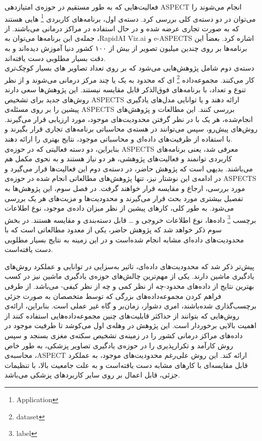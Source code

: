 فعالیت‌هایی که به طور مستقیم در حوزه‌ی امتیازدهی ASPECT انجام می‌شوند را می‌توان در دو دسته‌ی کلی بررسی کرد.
دسته‌ی اول، برنامه‌های کاربردی
\footnote{Application} ‌هایی هستند 
که به صورت تجاری عرضه شده و در حال استفاده در مراکز درمانی می‌باشند.
از جمله‌ی این برنامه‌ها می‌توان به ،RapidAI Viz.ai و e-ASPECTS اشاره کرد.
بعضاً این برنامه‌ها بر روی چندین میلیون تصویر از بیش از ۱۰۰ کشور دنیا آموزش دیده‌اند
\cite{rapidai}
و به دقت بسیار مطلوبی دست یافته‌اند.\\
دسته‌ی دوم شامل پژوهش‌هایی می‌شود که بر روی
تعداد تصاویر
های بسیار کوچک‌تری کار می‌کنند.
مجموعه‌داده‌
\footnote{dataset}
ای که محدود به یک یا چند مرکز درمانی می‌شوند و از نظر تنوع و تعداد،‌ با برنامه‌های فوق‌الذکر قابل مقایسه نیستند.
این پژوهش‌ها سعی دارند روش‌های جدید برای تشخیص ASPECTS ارائه دهند و یا توانایی مدل‌های یادگیری پیشین را بر روی مسئله‌ی ASPECTS بررسی کنند.
 این مطالعات و پژوهش‌های انجام‌شده، هر یک با در نظر 
 گرفتن محدودیت‌های  موجود، مورد ارزیابی قرار 
 می‌گیرند.
روش‌های پیش‌رو، سپس می‌توانند در هسته‌ی محاسباتی برنامه‌های تجاری قرار بگیرند 
و با استفاده از ظرفیت‌های داده‌ای و محاسباتی موجود، نتایج بهتری را ارائه دهند.\\
بنابراین، دو دسته فعالیتی که در حوزه‌ی ASPECTS معرفی شد، یعنی برنامه‌های کاربردی توانمند و فعالیت‌های پژوهشی، هر دو نیاز هستند و به نحوی مکمل هم می‌باشند.
بدیهی‌ است که پژوهش حاضر، در دسته‌ی دوم این فعالیت‌ها قرار می‌گیرد
و در ادامه‌ی این نوشتار نیز، تنها پژوهش‌های مطالعاتی انجام شده در حوزه‌ی ASPECTS مورد بررسی، ارجاع و مقایسه قرار خواهند گرفت.
در فصل سوم، این پژوهش‌ها به تفصیل بیشتری مورد 
بحث قرار می‌‌گیرند و
محدودیت‌ها و مزیت‌های هر یک بررسی می‌شود.
به طور کلی، کار‌های پیشین از نظر میزان داده‌ی موجود، نوع اطلاعات برچسب
\footnote{label}
داده‌ها،
نوع اطلاعات خروجی و
\dots 
قابل دسته‌بندی و مقایسه هستند.
در بخش سوم ذکر خواهد شد که پژوهش حاضر، یکی از معدود مطالعاتی است که با محدودیت‌های داده‌ای مشابه انجام شده‌است و 
در این زمینه به نتایج بسیار مطلوبی دست یافته‌است.


پیش‌تر ذکر شد که محدودیت‌های داده‌ای، تاثیر به‌سزایی در توانایی و عملکرد روش‌های یادگیری ماشین دارند.
یکی از مهم‌ترین چالش‌های حوزه‌ی یادگیری ماشین نیز در کسب بهترین نتایج از داده‌های محدود-چه از نظر کمی و چه از نظر کیفی- می‌باشد.
از طرفی فراهم کردن مجموعه‌داده‌های بزرگی که توسط متخصصان به صورت جزئی برچسب‌گذاری شده‌باشند، امری دشوار، زمان‌بر و گاه غیر عملی است.
بنابراین، ارائه‌ی روش‌هایی که بتوانند از حداکثر قابلیت‌های چنین مجموعه‌داده‌هایی استفاده کنند از اهمیت بالایی برخوردار است.
این پژوهش در وهله‌ی اول می‌کوشد تا طرفیت موجود در داده‌های مراکز درمانی کشور را در زمینه‌ی تشخیص سکته‌ی مغزی بسنجد و سپس روش کارآمد و تکرارپذیری را در حوزه‌ی یادگیری تصاویر پزشکی، به طور خاص محاسبه‌ی ،ASPECT ارائه کند.
این روش علی‌رغم محدودیت‌های موجود، به عملکرد قابل مقایسه‌ای با کارهای مشابه دست یافته‌است و
به علت جامعیت بالا، با تنظیمات جزئی، قابل اعمال بر روی سایر کاربرد‌های پزشکی می‌باشد.


